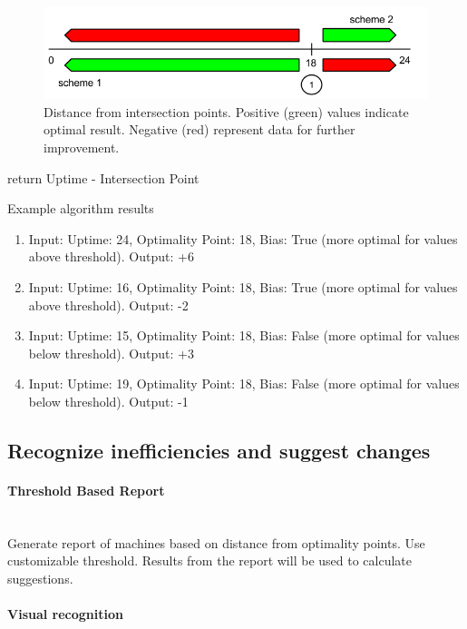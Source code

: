 \documentclass[]{final_report}
\newcommand{\myparagraph}[1]{\paragraph{#1}\mbox{}\\}
\begin{document}
\begin{figure}[H]
       \includegraphics[width=\linewidth]{figures/distance}
      \caption{Distance from intersection points. Positive (green) values indicate optimal result. Negative (red) represent data for further improvement.}
        \label{fig:distance}
\end{figure}

\begin{algorithm}[H]
 \label{alg:distance_from_optimality}
   {
        return Uptime - Intersection Point
  } 
\caption{Uptime Based Distance From Intersection Points}
\end{algorithm}

Example algorithm results
\begin{enumerate}
\item Input: Uptime: 24, Optimality Point: 18, Bias: True (more optimal for values above threshold). Output: +6
\item Input: Uptime: 16, Optimality Point: 18, Bias: True (more optimal for values above threshold). Output: -2
\item Input: Uptime: 15, Optimality Point: 18, Bias: False (more optimal for values below threshold). Output: +3
\item Input: Uptime: 19, Optimality Point: 18, Bias: False (more optimal for values below threshold). Output: -1
\end{enumerate}

\subsection{Recognize inefficiencies and suggest changes}

\myparagraph{Threshold Based Report}

Generate report of machines based on distance from optimality points. Use customizable threshold. 
Results from the report will be used to calculate suggestions.

\myparagraph{Visual recognition}
\end{document}
